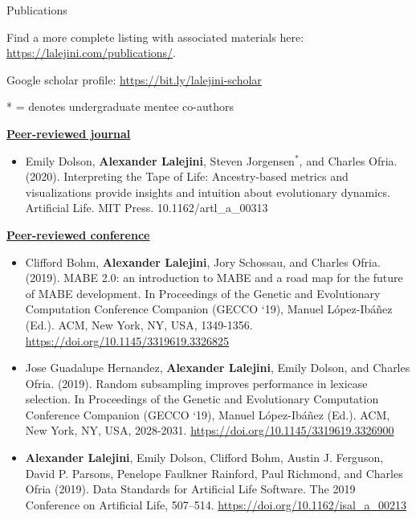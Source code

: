\begin{rSection}{Publications}

Find a more complete listing with associated materials here: \url{https://lalejini.com/publications/}.

Google scholar profile: \url{https://bit.ly/lalejini-scholar}

* = denotes undergraduate mentee co-authors

\underline{\large {\bf Peer-reviewed journal}}

\begin{itemize}
  \item Emily Dolson, \textbf{Alexander Lalejini}, Steven Jorgensen$^{*}$, and Charles Ofria. (2020).
  Interpreting the Tape of Life: Ancestry-based metrics and visualizations provide insights and intuition about evolutionary dynamics.
  Artificial Life. MIT Press. 10.1162/artl\_a\_00313
\end{itemize}

\underline{\large {\bf Peer-reviewed conference}}

\begin{itemize}

\item Clifford Bohm, \textbf{Alexander Lalejini}, Jory Schossau, and Charles Ofria. (2019).
MABE 2.0: an introduction to MABE and a road map for the future of MABE development.
In Proceedings of the Genetic and Evolutionary Computation Conference Companion (GECCO ‘19), Manuel López-Ibáñez (Ed.). ACM, New York, NY, USA, 1349-1356.
\url{https://doi.org/10.1145/3319619.3326825}

\item Jose Guadalupe Hernandez, \textbf{Alexander Lalejini}, Emily Dolson, and Charles Ofria. (2019).
Random subsampling improves performance in lexicase selection.
In Proceedings of the Genetic and Evolutionary Computation Conference Companion (GECCO ‘19), Manuel López-Ibáñez (Ed.). ACM, New York, NY, USA, 2028-2031.
\url{https://doi.org/10.1145/3319619.3326900}

\item \textbf{Alexander Lalejini}, Emily Dolson, Clifford Bohm, Austin J. Ferguson, David P. Parsons, Penelope Faulkner Rainford, Paul Richmond, and Charles Ofria (2019).
Data Standards for Artificial Life Software.
The 2019 Conference on Artificial Life, 507–514.
\url{https://doi.org/10.1162/isal_a_00213}


\end{itemize}
\end{rSection}
